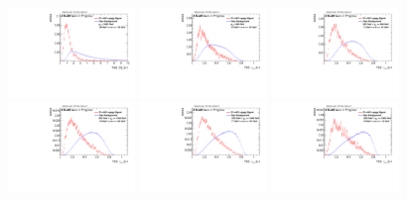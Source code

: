 \begin{figure}[H]
\includegraphics[width=0.3\textwidth]{sascha_input/Appendix/Distributions/w/distributions/beta1/h_assisted_tj_D2_bin6.pdf}
\bigskip 
\includegraphics[width=0.3\textwidth]{sascha_input/Appendix/Distributions/w/distributions/beta1/h_assisted_tj_nSub21_bin1.pdf} \hspace{1mm}
\includegraphics[width=0.3\textwidth]{sascha_input/Appendix/Distributions/w/distributions/beta1/h_assisted_tj_nSub21_bin2.pdf} \hspace{1mm}
\includegraphics[width=0.3\textwidth]{sascha_input/Appendix/Distributions/w/distributions/beta1/h_assisted_tj_nSub21_bin3.pdf} 
\bigskip
\includegraphics[width=0.3\textwidth]{sascha_input/Appendix/Distributions/w/distributions/beta1/h_assisted_tj_nSub21_bin4.pdf} \hspace{6mm}
\includegraphics[width=0.3\textwidth]{sascha_input/Appendix/Distributions/w/distributions/beta1/h_assisted_tj_nSub21_bin5.pdf} \hspace{6mm}

\end{figure}
